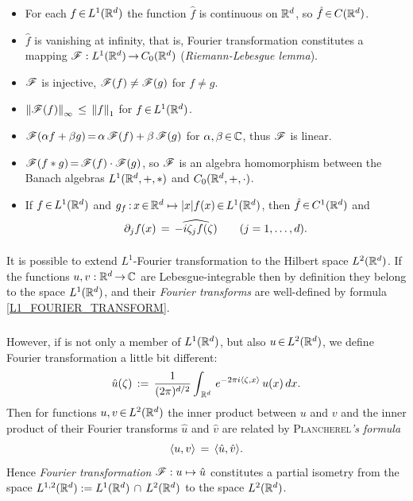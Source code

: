 \documentclass[11pt,twoside]{article}
\begin{document}
\begin{itemize}[leftmargin=12pt,itemsep=5pt]
\item[1.]
For each $f \xeof L^1(\Rd)$
the function $\hat{f}$ is continuous on $\Rd$,
so $\hat{f} \xeof C(\Rd)$.

\item[2.]
$\hat{f}$ is vanishing at infinity,
that is,
Fourier transformation constitutes a mapping $\FT:L^1(\Rd) \xto C_0(\Rd)$
(\textit{Riemann-Lebesgue lemma}).

\item[3.]
$\FT$ is injective, {\ie} $\FT(f) \neq \FT(g)$ for $f \neq g$.

\item[4.]
$\norm{\FT(f)}_{\infty} \, \leq \,
\norm{f}_1$ for $f \xeof L^1(\Rd)$.

\item[5.]
$\FT(\alpha f + \beta g) \eq \alpha \, \FT(f) + \beta \, \FT(g)$
for $\alpha,\beta \xeof \C$,
thus $\FT$ is linear.

\item[6.]
$\FT(f \ast g) \eq \FT(f) \cdot \FT(g)$,
so $\FT$ is an algebra homomorphism between the Banach algebras
$L^1(\Rd,+,\ast)$ and $C_0(\Rd,+,\cdot)$.

\item[7.]
If $f \xeof L^1(\Rd)$ and $g_f\:x \xeof \Rd \mapsto \abs{x} f(x) \xeof L^1(\Rd)$,
then $\hat{f} \xeof C^1(\Rd)$ and
\[
\partial_j f(x) \= \widehat{-i \zeta_j f(\zeta)}
\quad \quad (j=1,\ldots,d).
\]
\end{itemize}

\paragraph*{} %
It is possible
to extend $L^1$-Fourier transformation to the Hilbert space $L^2(\Rd)$.
If the functions $u,v:\Rd \xto \C$ are Lebesgue-integrable
then by definition they belong to the space $L^1(\Rd)$,
and their \textit{Fourier transforms} are well-defined
by formula \eqref{L1_FOURIER_TRANSFORM}.

\subparagraph*{}
However, 
if is not only a member of $L^1(\Rd)$, 
but also $u \xeof L^2(\Rd)$,
we define Fourier transformation a little bit different:
\begin{equation}\label{L2_FOURIER_TRANSFORM}
\hat{u}(\zeta) \eqdef
\frac{1}{(2 \pi)^{d/2}}
\int_{\,\Rd} \, e^{-2 \pi i \scalar{\zeta}{x}} \, u(x) \, dx.
\end{equation}
Then for functions $u,v \xeof L^2(\Rd)$ 
the inner product between $u$ and $v$
and the inner product of their Fourier transforms $\hat{u}$ and $\hat{v}$
are related by \textsc{Plancherel}\textit{'s formula}
\[
\scalar{u}{v} \= \scalar{ \hat{u} }{\hat{v} }.
\]
Hence \textit{Fourier transformation} $\FT:u \mapsto \hat{u} $
constitutes a partial isometry from the space
$L^{1,2}(\Rd) := L^1(\Rd) \, \cap \, L^2(\Rd)$
to the space $L^2(\Rd)$.
\end{document}

